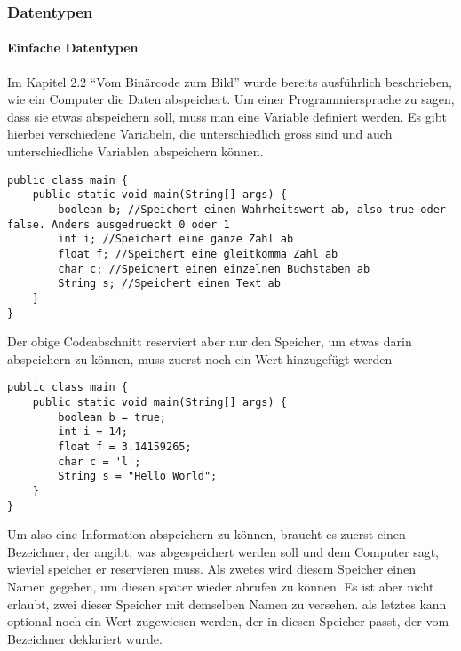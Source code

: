 \subsubsection{Datentypen}
\paragraph{Einfache Datentypen}
Im Kapitel 2.2 "`Vom Binärcode zum Bild"' wurde bereits ausführlich beschrieben, wie ein Computer die Daten abspeichert. Um einer Programmiersprache zu sagen, dass sie etwas abspeichern soll, muss man eine Variable definiert werden. Es gibt hierbei verschiedene Variabeln, die unterschiedlich gross sind und auch unterschiedliche Variablen abspeichern können.
\begin{lstlisting}
public class main {
	public static void main(String[] args) {
		boolean b; //Speichert einen Wahrheitswert ab, also true oder false. Anders ausgedrueckt 0 oder 1
		int i; //Speichert eine ganze Zahl ab
		float f; //Speichert eine gleitkomma Zahl ab
		char c; //Speichert einen einzelnen Buchstaben ab
		String s; //Speichert einen Text ab
	}
}
\end{lstlisting}
Der obige Codeabschnitt reserviert aber nur den Speicher, um etwas darin abspeichern zu können, muss zuerst noch ein Wert hinzugefügt werden
\begin{lstlisting}
public class main {
	public static void main(String[] args) {
		boolean b = true;
		int i = 14;
		float f = 3.14159265;
		char c = 'l';
		String s = "Hello World";
	}
}
\end{lstlisting}
Um also eine Information abspeichern zu können, braucht es zuerst einen Bezeichner, der angibt, was abgespeichert werden soll und dem Computer sagt, wieviel speicher er reservieren muss. Als zwetes wird diesem Speicher einen Namen gegeben, um diesen später wieder abrufen zu können. Es ist aber nicht erlaubt, zwei dieser Speicher mit demselben Namen zu versehen. als letztes kann optional noch ein Wert zugewiesen werden, der in diesen Speicher passt, der vom Bezeichner deklariert wurde.
